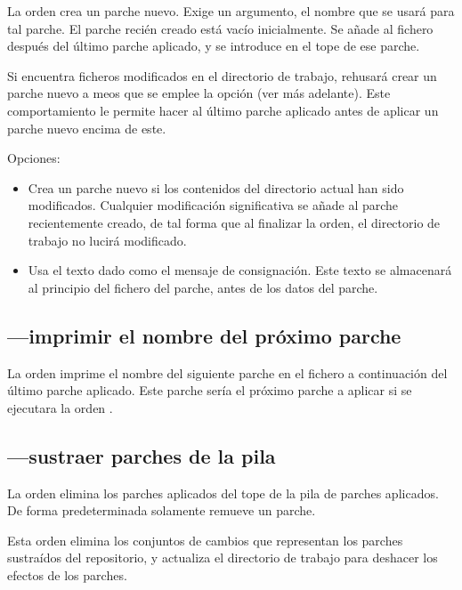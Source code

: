 La orden  crea un parche nuevo.  Exige un argumento,
el nombre que se usará para tal parche.  El parche recién creado está
vacío inicialmente.   Se añade al fichero  después
del último parche aplicado, y se introduce en el tope de ese parche.

Si  encuentra ficheros modificados en el directorio
de trabajo, rehusará crear un parche nuevo a meos que se emplee
 la opción (ver más adelante).  Este
comportamiento le permite hacer  al último parche
aplicado antes de aplicar un parche nuevo encima de este.

Opciones:
\begin{itemize}
\item[\hgxopt{mq}{qnew}{-f}] Crea un parche nuevo si los contenidos
  del directorio actual han sido modificados.  Cualquier modificación
  significativa se añade al parche recientemente creado,  de tal forma
  que al finalizar la orden, el directorio de trabajo no lucirá
  modificado.
\item[\hgxopt{mq}{qnew}{-m}] Usa el texto dado como el mensaje de
  consignación.  Este texto se almacenará al principio del fichero del
  parche, antes de los datos del parche.
\end{itemize}

\subsection{---imprimir el nombre del próximo parche}

La orden  imprime el nombre del siguiente parche en
el fichero  a continuación del último parche
aplicado.  Este parche sería el próximo parche a aplicar si se
ejecutara la orden .

\subsection{---sustraer parches de la pila}

La orden  elimina los parches aplicados del tope de
la pila de parches aplicados.  De forma predeterminada solamente
remueve un parche.

Esta orden elimina los conjuntos de cambios que representan los
parches sustraídos del repositorio, y actualiza el directorio de
trabajo para deshacer los efectos de los parches.

